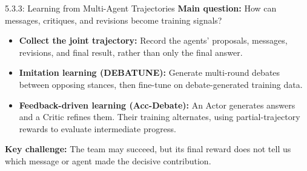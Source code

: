 \documentclass[aspectratio=169]{beamer}
\begin{document}
\begin{frame}{5.3.3: Learning from Multi-Agent Trajectories}
\small
\textbf{Main question:} How can messages, critiques, and revisions become training signals?

\vspace{0.2cm}
\begin{itemize}
    \item \textbf{Collect the joint trajectory:}
    Record the agents' proposals, messages, revisions, and final result, rather than only the final answer.

    \vspace{0.15cm}
    \item \textbf{Imitation learning (DEBATUNE):}
    Generate multi-round debates between opposing stances, then fine-tune on debate-generated training data.

    \vspace{0.15cm}
    \item \textbf{Feedback-driven learning (Acc-Debate):}
    An Actor generates answers and a Critic refines them. Their training alternates, using partial-trajectory rewards to evaluate intermediate progress.
\end{itemize}

\vspace{0.2cm}
\textbf{Key challenge:} The team may succeed, but its final reward does not tell us which message or agent made the decisive contribution.

\end{frame}
\end{document}
